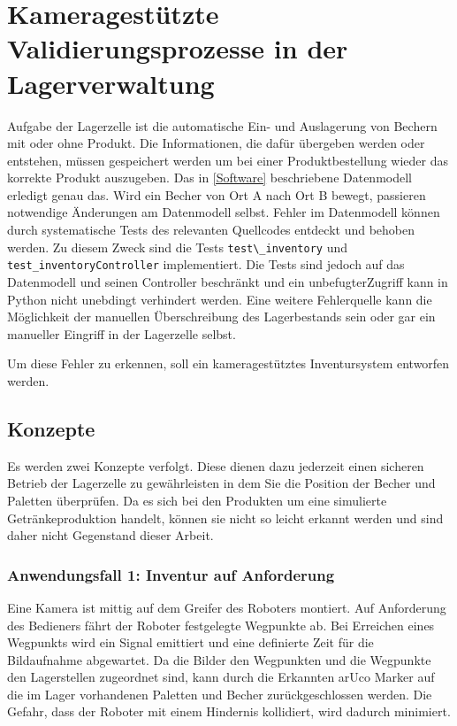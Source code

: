 ﻿\chapter{Kameragestützte Validierungsprozesse in der Lagerverwaltung}\label{KameragestützteInventur}

Aufgabe der Lagerzelle ist die automatische Ein- und Auslagerung von Bechern mit oder ohne Produkt.
Die Informationen, die dafür übergeben werden oder entstehen, müssen gespeichert werden um bei einer Produktbestellung wieder das korrekte Produkt auszugeben.
Das in \ref{Software} beschriebene Datenmodell erledigt genau das. Wird ein Becher von Ort A nach Ort B bewegt, 
passieren notwendige Änderungen am Datenmodell selbst. Fehler im Datenmodell können durch systematische Tests des relevanten Quellcodes entdeckt und behoben werden. 
Zu diesem Zweck sind die Tests \verb|test\_inventory| und \verb|test_inventoryController| implementiert. 
Die Tests sind jedoch auf das Datenmodell und seinen Controller beschränkt und ein \glq unbefugter\grq Zugriff kann in Python nicht unebdingt verhindert werden. 
Eine weitere Fehlerquelle kann die Möglichkeit der manuellen Überschreibung des Lagerbestands sein oder gar ein manueller Eingriff in der Lagerzelle selbst. 

Um diese Fehler zu erkennen, soll ein kameragestütztes Inventursystem entworfen werden. 
    \section {Konzepte}

    Es werden zwei Konzepte verfolgt.
    Diese dienen dazu jederzeit einen sicheren Betrieb der Lagerzelle zu gewährleisten in dem Sie die Position der Becher und Paletten überprüfen.
    Da es sich bei den Produkten um eine simulierte Getränkeproduktion handelt, können sie nicht so leicht erkannt werden und sind daher nicht Gegenstand dieser Arbeit. 

    \subsection{Anwendungsfall 1: Inventur auf Anforderung}\label{InventurAufAnforderung}

    Eine Kamera ist mittig auf dem Greifer des Roboters montiert. Auf Anforderung des Bedieners fährt der Roboter festgelegte Wegpunkte ab. 
    Bei Erreichen eines Wegpunkts wird ein Signal emittiert und eine definierte Zeit für die Bildaufnahme abgewartet.
    Da die Bilder den Wegpunkten und die Wegpunkte den Lagerstellen zugeordnet sind, kann durch die Erkannten arUco Marker auf die 
    im Lager vorhandenen Paletten und Becher zurückgeschlossen werden. 
    Die Gefahr, dass der Roboter mit einem Hindernis kollidiert, wird dadurch minimiert. 

